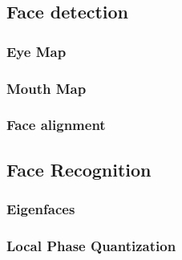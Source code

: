 \subsection{Face detection}
\subsubsection{Eye Map}
\label{sub:FaceDetection}


\subsubsection{Mouth Map}


\subsubsection{Face alignment}


\subsection{Face Recognition}
\label{sub:FaceRecognition}


\subsubsection{Eigenfaces}
\label{subs:Eigenfaces}


\subsubsection{Local Phase Quantization}
\label{subs:LocalPhaseQuantization}

